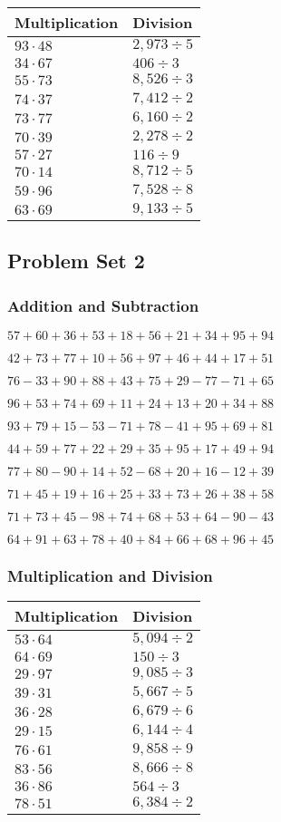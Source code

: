 \begin{longtable}[]{@{}ll@{}}
\toprule
Multiplication & Division\tabularnewline
\midrule
\endhead
\(93\cdot48\) & \(2,973÷5\)\tabularnewline
\(34\cdot67\) & \(406÷3\)\tabularnewline
\(55\cdot73\) & \(8,526÷3\)\tabularnewline
\(74\cdot37\) & \(7,412÷2\)\tabularnewline
\(73\cdot77\) & \(6,160÷2\)\tabularnewline
\(70\cdot39\) & \(2,278÷2\)\tabularnewline
\(57\cdot27\) & \(116 ÷9\)\tabularnewline
\(70\cdot14\) & \(8,712÷5\)\tabularnewline
\(59\cdot96\) & \(7,528÷8\)\tabularnewline
\(63\cdot69\) & \(9,133÷5\)\tabularnewline
\bottomrule
\end{longtable}

\hypertarget{problem-set-2-1}{%
\subsection{Problem Set 2}\label{problem-set-2-1}}

\hypertarget{addition-and-subtraction-42}{%
\subsubsection{Addition and
Subtraction}\label{addition-and-subtraction-42}}

\(57+60+36+53+18+56+21+34+95+ 94\)

\(42+73+77+10+56+97+46+44+17+51\)

\(76-33+90+88+43+75+29-77-71+65\)

\(96+53+74+69+11+24+13+20+34+88\)

\(93+79+15-53-71+78-41+95+69+81\)

\(44+59+77+22+29+35+95+17+49+94\)

\(77+80-90+14+52-68+20+16-12+39\)

\(71+45+19+16+25+33+73+26+38+58\)

\(71+73+45-98+74+68+53+64-90-43\)

\(64+91+63+78+40+84+66+68+96+45\)

\hypertarget{multiplication-and-division-42}{%
\subsubsection{Multiplication and
Division}\label{multiplication-and-division-42}}

\begin{longtable}[]{@{}ll@{}}
\toprule
Multiplication & Division\tabularnewline
\midrule
\endhead
\(53\cdot64\) & \(5,094÷2\)\tabularnewline
\(64\cdot69\) & \(150÷3\)\tabularnewline
\(29\cdot97\) & \(9,085÷3\)\tabularnewline
\(39\cdot31\) & \(5,667÷5\)\tabularnewline
\(36\cdot28\) & \(6,679÷6\)\tabularnewline
\(29\cdot15\) & \(6,144÷4\)\tabularnewline
\(76\cdot61\) & \(9,858÷9\)\tabularnewline
\(83\cdot56\) & \(8,666÷8\)\tabularnewline
\(36\cdot86\) & \(564÷3\)\tabularnewline
\(78\cdot51\) & \(6,384÷2\)\tabularnewline
\bottomrule
\end{longtable}

